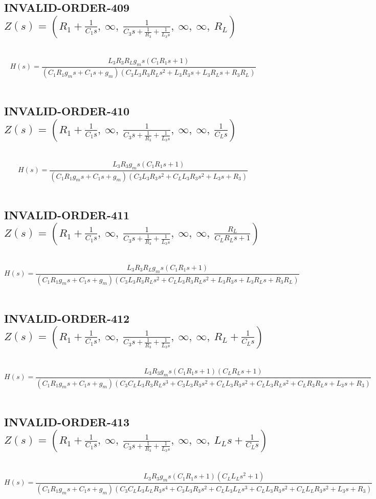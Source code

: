 \documentclass{article}
\begin{document}
\subsection{INVALID-ORDER-409 $Z(s) = \left( R_{1} + \frac{1}{C_{1} s}, \  \infty, \  \frac{1}{C_{3} s + \frac{1}{R_{3}} + \frac{1}{L_{3} s}}, \  \infty, \  \infty, \  R_{L}\right)$ } \ 
\textbf{\[H(s) = \frac{L_{3} R_{3} R_{L} g_{m} s \left(C_{1} R_{1} s + 1\right)}{\left(C_{1} R_{1} g_{m} s + C_{1} s + g_{m}\right) \left(C_{3} L_{3} R_{3} R_{L} s^{2} + L_{3} R_{3} s + L_{3} R_{L} s + R_{3} R_{L}\right)}\] } \ 
\subsection{INVALID-ORDER-410 $Z(s) = \left( R_{1} + \frac{1}{C_{1} s}, \  \infty, \  \frac{1}{C_{3} s + \frac{1}{R_{3}} + \frac{1}{L_{3} s}}, \  \infty, \  \infty, \  \frac{1}{C_{L} s}\right)$ } \ 
\textbf{\[H(s) = \frac{L_{3} R_{3} g_{m} s \left(C_{1} R_{1} s + 1\right)}{\left(C_{1} R_{1} g_{m} s + C_{1} s + g_{m}\right) \left(C_{3} L_{3} R_{3} s^{2} + C_{L} L_{3} R_{3} s^{2} + L_{3} s + R_{3}\right)}\] } \ 
\subsection{INVALID-ORDER-411 $Z(s) = \left( R_{1} + \frac{1}{C_{1} s}, \  \infty, \  \frac{1}{C_{3} s + \frac{1}{R_{3}} + \frac{1}{L_{3} s}}, \  \infty, \  \infty, \  \frac{R_{L}}{C_{L} R_{L} s + 1}\right)$ } \ 
\textbf{\[H(s) = \frac{L_{3} R_{3} R_{L} g_{m} s \left(C_{1} R_{1} s + 1\right)}{\left(C_{1} R_{1} g_{m} s + C_{1} s + g_{m}\right) \left(C_{3} L_{3} R_{3} R_{L} s^{2} + C_{L} L_{3} R_{3} R_{L} s^{2} + L_{3} R_{3} s + L_{3} R_{L} s + R_{3} R_{L}\right)}\] } \ 
\subsection{INVALID-ORDER-412 $Z(s) = \left( R_{1} + \frac{1}{C_{1} s}, \  \infty, \  \frac{1}{C_{3} s + \frac{1}{R_{3}} + \frac{1}{L_{3} s}}, \  \infty, \  \infty, \  R_{L} + \frac{1}{C_{L} s}\right)$ } \ 
\textbf{\[H(s) = \frac{L_{3} R_{3} g_{m} s \left(C_{1} R_{1} s + 1\right) \left(C_{L} R_{L} s + 1\right)}{\left(C_{1} R_{1} g_{m} s + C_{1} s + g_{m}\right) \left(C_{3} C_{L} L_{3} R_{3} R_{L} s^{3} + C_{3} L_{3} R_{3} s^{2} + C_{L} L_{3} R_{3} s^{2} + C_{L} L_{3} R_{L} s^{2} + C_{L} R_{3} R_{L} s + L_{3} s + R_{3}\right)}\] } \ 
\subsection{INVALID-ORDER-413 $Z(s) = \left( R_{1} + \frac{1}{C_{1} s}, \  \infty, \  \frac{1}{C_{3} s + \frac{1}{R_{3}} + \frac{1}{L_{3} s}}, \  \infty, \  \infty, \  L_{L} s + \frac{1}{C_{L} s}\right)$ } \ 
\textbf{\[H(s) = \frac{L_{3} R_{3} g_{m} s \left(C_{1} R_{1} s + 1\right) \left(C_{L} L_{L} s^{2} + 1\right)}{\left(C_{1} R_{1} g_{m} s + C_{1} s + g_{m}\right) \left(C_{3} C_{L} L_{3} L_{L} R_{3} s^{4} + C_{3} L_{3} R_{3} s^{2} + C_{L} L_{3} L_{L} s^{3} + C_{L} L_{3} R_{3} s^{2} + C_{L} L_{L} R_{3} s^{2} + L_{3} s + R_{3}\right)}\] } \ 
\end{document}
